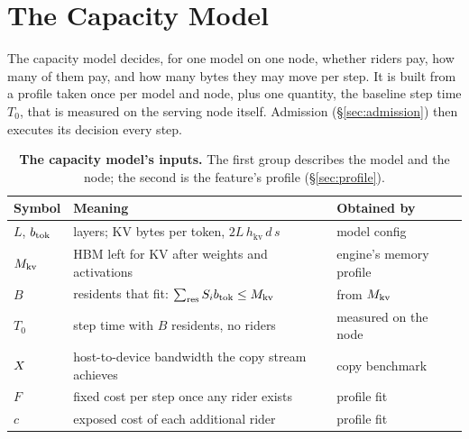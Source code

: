 
\section{The Capacity Model}\label{sec:model}

The capacity model decides, for one model on one node, whether riders pay, how
many of them pay, and how many bytes they may move per step. It is built from a
profile taken once per model and node, plus one quantity, the baseline step
time $T_0$, that is measured on the serving node itself. Admission
(\S\ref{sec:admission}) then executes its decision every step.

\begin{table}[htb]
\centering\small\setlength{\tabcolsep}{3.5pt}
\caption{\textbf{The capacity model's inputs.} The first group describes the
model and the node; the second is the feature's profile (\S\ref{sec:profile}).}
\label{tab:symbols}
\begin{tabular}{@{}l >{\raggedright\arraybackslash}p{3.9cm} >{\raggedright\arraybackslash}p{2.2cm}@{}}
\toprule
Symbol & Meaning & Obtained by \\
\midrule
$L$, $b_{\mathrm{tok}}$ & layers; KV bytes per token, $2L\,h_{\mathrm{kv}}\,d\,s$ & model config \\
$M_{\mathrm{kv}}$ & HBM left for KV after weights and activations & engine's memory profile \\
$B$ & residents that fit: $\sum_{\mathrm{res}} S_ib_{\mathrm{tok}} \le M_{\mathrm{kv}}$ & from $M_{\mathrm{kv}}$ \\
$T_0$ & step time with $B$ residents, no riders & measured on the node \\
$X$ & host-to-device bandwidth the copy stream achieves & copy benchmark \\
\midrule
$F$ & fixed cost per step once any rider exists & profile fit \\
$c$ & exposed cost of each additional rider & profile fit \\
\bottomrule
\end{tabular}
\end{table}


